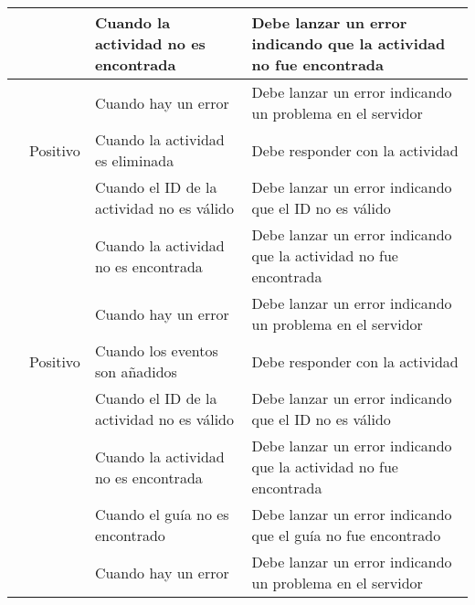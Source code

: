 \begin{small}
\begin{longtable}[H]{|>{\centering\arraybackslash}m{3cm}|>{\centering\arraybackslash}m{2cm}|>{\centering\arraybackslash}m{3cm}|>{\centering\arraybackslash}m{4cm}|}
		\cline{3-4}
		                                    &                             & Cuando la actividad no es encontrada      & Debe lanzar un error indicando que la actividad no fue encontrada \\
		\cline{3-4}
		                                    &                             & Cuando hay un error                       & Debe lanzar un error indicando un problema en el servidor         \\
		\hline
		\multirow{4}{4cm}{Delete activity}  & Positivo                    & Cuando la actividad es eliminada          & Debe responder con la actividad                                   \\
		\cline{2-4}
		                                    & \multirow{3}{3cm}{Negativo} & Cuando el ID de la actividad no es válido & Debe lanzar un error indicando que el ID no es válido             \\
		\cline{3-4}
		                                    &                             & Cuando la actividad no es encontrada      & Debe lanzar un error indicando que la actividad no fue encontrada \\
		\cline{3-4}
		                                    &                             & Cuando hay un error                       & Debe lanzar un error indicando un problema en el servidor         \\
		\hline
		\multirow{5}{4cm}{Add events}       & Positivo                    & Cuando los eventos son añadidos           & Debe responder con la actividad                                   \\
		\cline{2-4}
		                                    & \multirow{4}{3cm}{Negativo} & Cuando el ID de la actividad no es válido & Debe lanzar un error indicando que el ID no es válido             \\
		\cline{3-4}
		                                    &                             & Cuando la actividad no es encontrada      & Debe lanzar un error indicando que la actividad no fue encontrada \\
		\cline{3-4}
		                                    &                             & Cuando el guía no es encontrado           & Debe lanzar un error indicando que el guía no fue encontrado      \\
		\cline{3-4}
		                                    &                             & Cuando hay un error                       & Debe lanzar un error indicando un problema en el servidor         \\
		\hline

\end{longtable}
\end{small}
